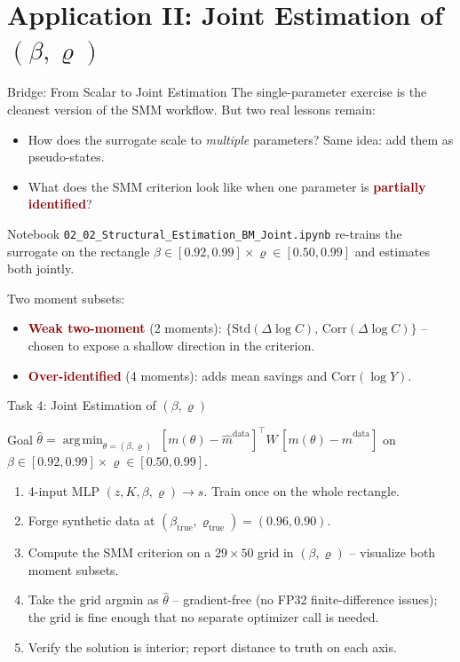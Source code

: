 \documentclass[10pt,aspectratio=169]{beamer}
\newcommand{\emphc}[1]{\textbf{\textcolor{darkred}{#1}}}
\DeclareMathOperator*{\argmin}{arg\,min}
\begin{document}
\section{Application II: Joint Estimation of $(\beta, \varrho)$}
\begin{frame}{Bridge: From Scalar to Joint Estimation}
\small
The single-parameter exercise is the cleanest version of the SMM workflow. But two real lessons remain:
\begin{itemize}
\itemsep1pt
  \item How does the surrogate scale to \emph{multiple} parameters? Same idea: add them as pseudo-states.
  \item What does the SMM criterion look like when one parameter is \emphc{partially identified}?
\end{itemize}
\vspace{0.1cm}
Notebook \texttt{02\_02\_Structural\_Estimation\_BM\_Joint.ipynb} re-trains the surrogate on the rectangle $\beta \in [0.92, 0.99] \times \varrho \in [0.50, 0.99]$ and estimates both jointly.

\vspace{0.2cm}
Two moment subsets:
\begin{itemize}
  \item \emphc{Weak two-moment} (2 moments): $\{\mathrm{Std}(\Delta\log C),\,\mathrm{Corr}(\Delta\log C)\}$ -- chosen to expose a shallow direction in the criterion.
  \item \emphc{Over-identified} (4 moments): adds mean savings and $\mathrm{Corr}(\log Y)$.
\end{itemize}
\end{frame}

\begin{frame}{Task 4: Joint Estimation of $(\beta, \varrho)$}
\begin{block}{Goal}
$\hat\theta = \argmin_{\theta = (\beta,\varrho)}\; [m(\theta) - \hat{m}^{\mathrm{data}}]^\top W\, [m(\theta) - \hat{m}^{\mathrm{data}}]$ \quad on $\beta\in[0.92,0.99] \times \varrho\in[0.50, 0.99]$.
\end{block}
\begin{enumerate}
  \itemsep1pt
  \item 4-input MLP $(z, K, \beta, \varrho) \to s$. Train once on the whole rectangle.
  \item Forge synthetic data at $(\beta_{\text{true}}, \varrho_{\text{true}}) = (0.96, 0.90)$.
  \item Compute the SMM criterion on a $29\times 50$ grid in $(\beta, \varrho)$ -- visualize both moment subsets.
  \item Take the grid argmin as $\hat\theta$ -- gradient-free (no FP32 finite-difference issues); the grid is fine enough that no separate optimizer call is needed.
  \item Verify the solution is interior; report distance to truth on each axis.
\end{enumerate}
\end{frame}
\end{document}

